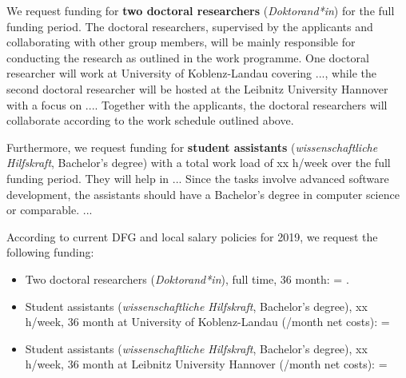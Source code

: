 

We request funding for \textbf{two doctoral researchers} (\emph{Doktorand*in}) for the full funding period. The doctoral researchers, supervised by the applicants and collaborating with other group members, will be mainly responsible for conducting the research as outlined in the work programme. 
One doctoral researcher will work at University of Koblenz-Landau covering ..., while the second doctoral researcher will be hosted at the Leibnitz University Hannover with a focus on .... Together with the applicants, the doctoral researchers will collaborate according to the work schedule outlined above.

Furthermore, we request funding for 
\textbf{student assistants} (\emph{wissenschaftliche Hilfskraft}, Bachelor's degree) with a total work load of xx h/week over the full funding period. They will help in ...
Since the tasks involve advanced software development, the assistants should have a Bachelor's degree in computer science or comparable. ... 

According to current DFG and local salary policies for 2019, we request the following funding:
\vspace{-4pt}
\begin{itemize} \setlength\itemsep{-0.4em}
	\item Two doctoral researchers (\emph{Doktorand*in}), full time, 36 month:  = \textbf{}.

	\item Student assistants (\emph{wissenschaftliche Hilfskraft}, Bachelor's degree), xx h/week, 36 month at University of Koblenz-Landau (/month net costs):  = \textbf{}
		\item Student assistants (\emph{wissenschaftliche Hilfskraft}, Bachelor's degree), xx h/week, 36 month at Leibnitz University Hannover (/month net costs):  = \textbf{} 
\end{itemize}

